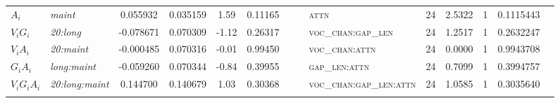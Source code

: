\begin{table}
\begin{tabular}{ l >{\itshape}l S S S S[round-precision=3,round-minimum=0.001,table-format=>1.3] c c >{\scshape}l c S c S[round-precision=3,round-minimum=0.001,table-format=>1.3] c@{} }
	$A_i$             & maint                 &  0.055932               & 0.035159               &   1.59                       &  0.11165                &         & & attn                                           & 24                  & 2.5322                                & 1                               & 0.1115443                             &                      \\ 
	$V_i G_i$         & 20:long               & -0.078671               & 0.070309               &  -1.12                       &  0.26317                &         & & voc\_chan:gap\_len                             & 24                  & 1.2517                                & 1                               & 0.2632247                             &                      \\ 
	$V_i A_i$         & 20:maint              & -0.000485               & 0.070316               &  -0.01                       &  0.99450                &         & & voc\_chan:attn                                 & 24                  & 0.0000                                & 1                               & 0.9943708                             &                      \\ 
	$G_i A_i$         & long:maint            & -0.059260               & 0.070344               &  -0.84                       &  0.39955                &         & & gap\_len:attn                                  & 24                  & 0.7099                                & 1                               & 0.3994757                             &                      \\ 
	$V_i G_i A_i$     & 20:long:maint         &  0.144700               & 0.140679               &   1.03                       &  0.30368                &         & & voc\_chan:gap\_len:attn                        & 24                  & 1.0585                                & 1                               & 0.3035640                             &                      \\ \midrule
	 &                 &                        &                              &                         &         & &                                                &                     &                                       &                                 &                                       &                      \\

\end{tabular}
\end{table}
